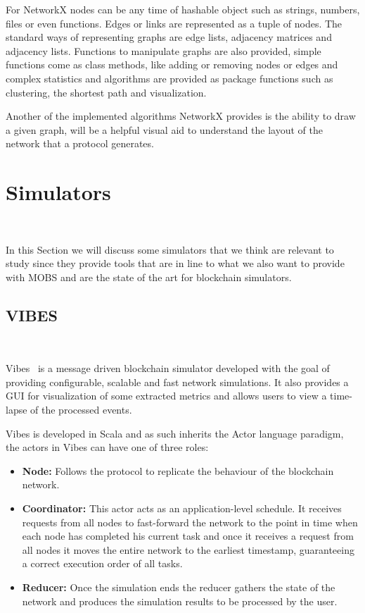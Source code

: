For NetworkX nodes can be any time of hashable object such as strings, numbers,
files or even functions. Edges or links are represented as a tuple of nodes. The
standard ways of representing graphs are edge lists, adjacency matrices and adjacency
lists. Functions to manipulate graphs are also provided, simple functions come as class
methods, like adding or removing nodes or edges and complex statistics and algorithms
are provided as package functions such as clustering, the shortest path and visualization.

Another of the implemented algorithms NetworkX provides is the ability to draw
a given graph, will be a helpful visual aid to understand the layout of the network
that a protocol generates.

\section{Simulators}~\label{sec:simulators}

In this Section we will discuss some simulators that we think are relevant to study
since they provide tools that are in line to what we also want to provide with MOBS and
are the state of the art for blockchain simulators.

\subsection{VIBES}~\label{subsec:vibes}

Vibes~\cite{vibes} is a message driven blockchain simulator developed with the goal of providing
configurable, scalable and fast network simulations. It also provides a GUI for visualization
of some extracted metrics and allows users to view a time-lapse of the processed events.

Vibes is developed in Scala and as such inherits the Actor language paradigm, the actors in
Vibes can have one of three roles:

\begin{itemize}
  \item \textbf{Node:} Follows the protocol to replicate the behaviour of the blockchain
  network.
  \item \textbf{Coordinator:} This actor acts as an application-level schedule. It receives
  requests from all nodes to fast-forward the network to the point in time when each node
  has completed his current task and once it receives a request from all nodes it moves the
  entire network to the earliest timestamp, guaranteeing a correct execution order of all tasks.
  \item \textbf{Reducer:} Once the simulation ends the reducer gathers the state of the network
  and produces the simulation results to be processed by the user.
\end{itemize}

